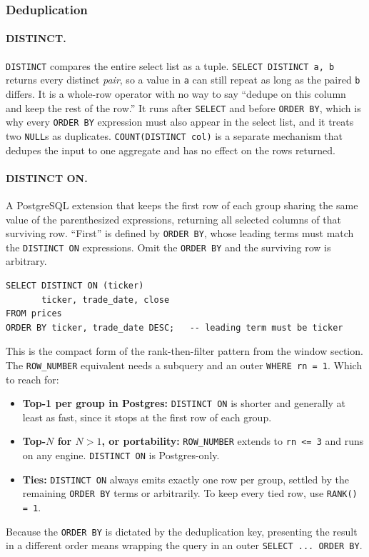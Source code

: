\subsubsection{Deduplication}

\paragraph{DISTINCT.} \texttt{DISTINCT} compares the entire select list as a
tuple. \texttt{SELECT DISTINCT a, b} returns every distinct \emph{pair}, so a
value in \texttt{a} can still repeat as long as the paired \texttt{b} differs.
It is a whole-row operator with no way to say ``dedupe on this column and keep
the rest of the row.'' It runs after \texttt{SELECT} and before
\texttt{ORDER BY}, which is why every \texttt{ORDER BY} expression must also
appear in the select list, and it treats two \texttt{NULL}s as duplicates.
\texttt{COUNT(DISTINCT col)} is a separate mechanism that dedupes the input to
one aggregate and has no effect on the rows returned.

\newpage

\paragraph{DISTINCT ON.} A PostgreSQL extension that keeps the first row of
each group sharing the same value of the parenthesized expressions, returning
all selected columns of that surviving row. ``First'' is defined by
\texttt{ORDER BY}, whose leading terms must match the \texttt{DISTINCT ON}
expressions. Omit the \texttt{ORDER BY} and the surviving row is arbitrary.

\begin{lstlisting}[style=sql, caption={Most recent close per ticker}]
SELECT DISTINCT ON (ticker)
       ticker, trade_date, close
FROM prices
ORDER BY ticker, trade_date DESC;   -- leading term must be ticker
\end{lstlisting}

\vspace{-1ex}

This is the compact form of the rank-then-filter pattern from the window
section. The \texttt{ROW\_NUMBER} equivalent needs a subquery and an outer
\texttt{WHERE rn = 1}. Which to reach for:

\begin{itemize}[label=$\circ$]
  \item \textbf{Top-1 per group in Postgres:} \texttt{DISTINCT ON} is shorter
  and generally at least as fast, since it stops at the first row of each
  group.
  \item \textbf{Top-$N$ for $N > 1$, or portability:} \texttt{ROW\_NUMBER}
  extends to \texttt{rn <= 3} and runs on any engine. \texttt{DISTINCT ON} is
  Postgres-only.
  \item \textbf{Ties:} \texttt{DISTINCT ON} always emits exactly one row per
  group, settled by the remaining \texttt{ORDER BY} terms or arbitrarily. To
  keep every tied row, use \texttt{RANK() = 1}.
\end{itemize}

Because the \texttt{ORDER BY} is dictated by the deduplication key, presenting
the result in a different order means wrapping the query in an outer
\texttt{SELECT ... ORDER BY}.
